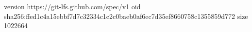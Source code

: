 version https://git-lfs.github.com/spec/v1
oid sha256:ffed1c4a15ebbf7d7c32334c1c2c0baeb0af6ec7d35ef8660758c1355859d772
size 1022664

